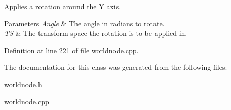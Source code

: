 Applies a rotation around the Y axis. 


\begin{DoxyParams}{Parameters}
{\em Angle} & The angle in radians to rotate. \\
\hline
{\em TS} & The transform space the rotation is to be applied in. \\
\hline
\end{DoxyParams}


Definition at line 221 of file worldnode.cpp.



The documentation for this class was generated from the following files:\begin{DoxyCompactItemize}
\item 
\hyperlink{worldnode_8h}{worldnode.h}\item 
\hyperlink{worldnode_8cpp}{worldnode.cpp}\end{DoxyCompactItemize}
